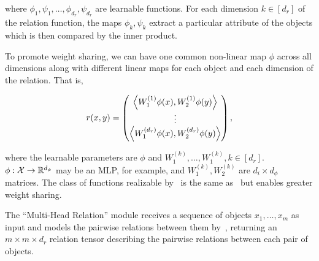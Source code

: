\noindent where $\phi_1, \psi_1, \ldots, \phi_{d_r}, \psi_{d_r}$ are learnable functions. For each dimension $k \in [d_r]$ of the relation function, the maps $\phi_k, \psi_k$ extract a particular attribute of the objects which is then compared by the inner product.

To promote weight sharing, we can have one common non-linear map $\phi$ across all dimensions along with different linear maps for each object and each dimension of the relation. That is, 

\begin{equation}\label{eq:relation_function_lin_proj}
    r(x, y) = \begin{pmatrix}
        \left \langle W_1^{(1)}\phi(x), W_2^{(1)}\phi(y) \right\rangle \\
        \vdots \\
        \left \langle W_1^{(d_r)}\phi(x), W_2^{(d_r)}\phi(y) \right\rangle \\
    \end{pmatrix},
\end{equation}

\noindent where the learnable parameters are $\phi$ and $W_1^{(k)}, \ldots, W_1^{(k)}, k \in [d_r]$. $\phi: {\mathcal{X}} \to \mathbb{R}^{d_\phi}$ may be an MLP, for example, and $W_1^{(k)}, W_2^{(k)}$ are $d_i \times d_\phi$ matrices. The class of functions realizable by~ is the same as~ but enables greater weight sharing.

The ``Multi-Head Relation'' module receives a sequence of objects $x_1, \ldots, x_m$ as input and models the pairwise relations between them by~, returning an $m \times m \times d_r$ relation tensor describing the pairwise relations between each pair of objects. 